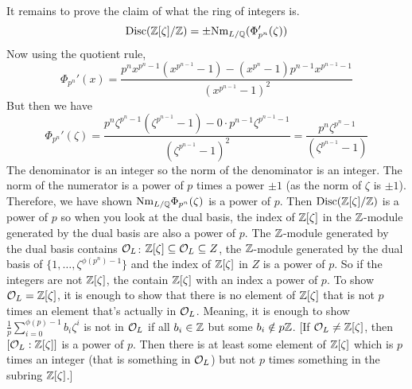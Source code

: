 It remains to prove the claim of what the ring of integers is. 
	\[
	\operatorname{Disc}(\mathbb{Z}[\zeta]/\mathbb{Z})= \pm \text{Nm}_{L/\mathbb{Q}}(\Phi_{p^n}'(\zeta))
	\]
Now using the quotient rule,
	\[
	\Phi_{p^n}'(x)= \dfrac{p^n x^{p^{n}-1}(x^{p^{n-1}}-1) - (x^{p^{n}}-1) p^{n-1} x^{p^{n-1}-1}}{(x^{p^{n-1}} -1)^2}
	\]
But then we have
	\[
	\Phi_{p^n}'(\zeta)=\dfrac{p^n\zeta^{p^n-1}(\zeta^{p^{n-1}}-1) - 0 \cdot p^{n-1} \zeta^{p^{n-1}-1}}{(\zeta^{p^{n-1}}-1)^2}= \dfrac{p^n \zeta^{p^n -1}}{(\zeta^{p^{n-1}}-1)}
	\]
The denominator is an integer so the norm of the denominator is an integer. The norm of the numerator is a power of $p$ times a power $\pm 1$ (as the norm of $\zeta$ is $\pm 1$). Therefore, we have shown $\text{Nm}_{L/\mathbb{Q}} \Phi_{p^n}(\zeta)$ is a power of $p$. Then $\operatorname{Disc}(\mathbb{Z}[\zeta]/\mathbb{Z})$ is a power of $p$ so when you look at the dual basis, the index of $\mathbb{Z}[\zeta]$ in the $\mathbb{Z}$-module generated by the dual basis are also a power of $p$. The $\mathbb{Z}$-module generated by the dual basis contains $\mathcal{O}_L$: $\mathbb{Z}[\zeta] \subseteq \mathcal{O}_L \subseteq Z$, the $\mathbb{Z}$-module generated by the dual basis of $\{1,\ldots,\zeta^{\phi(p^n)-1}\}$ and the index of $\mathbb{Z}[\zeta]$ in $Z$ is a power of $p$. So if the integers are not $\mathbb{Z}[\zeta]$, the contain $\mathbb{Z}[\zeta]$ with an index a power of $p$. To show $\mathcal{O}_L=\mathbb{Z}[\zeta]$, it is enough to show that there is no element of $\mathbb{Z}[\zeta]$ that is not $p$ times an element that's actually in $\mathcal{O}_L$. Meaning, it is enough to show $\frac{1}{p} \sum_{i=0}^{\phi(p)-1} b_i \zeta^i$ is not in $\mathcal{O}_L$ if all $b_i \in \mathbb{Z}$ but some $b_i \notin p\mathbb{Z}$. [If $\mathcal{O}_L \neq \mathbb{Z}[\zeta]$, then $[\mathcal{O}_L:\mathbb{Z}[\zeta]]$ is a power of $p$. Then there is at least some element of $\mathbb{Z}[\zeta]$ which is $p$ times an integer (that is something in $\mathcal{O}_L$) but not $p$ times something in the subring $\mathbb{Z}[\zeta]$.]


